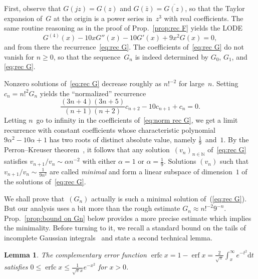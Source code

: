 \documentclass[10pt, conference]{IEEEtran}
\newtheorem{lemma}{Lemma}
\newcommand{\mathd}{\mathrm{d}}
\begin{document}
\begin{IEEEproof}
  First, observe that $G(jz) = G(z)$ and $G(
  \bar{z}) = \overline{G(z)}$, so that the Taylor
  expansion of~$G$ at the origin is a power series in~$z^3$ with
  real coefficients. The same routine reasoning as in the proof of
  Prop.~\ref{prop:rec F} yields the LODE
  \[ G^{(4)}(x) - 10 xG''(x) - 10 G' (x) + 9 x^2 G(x) = 0, \]
  and from there the recurrence~\eqref{eq:rec G}. The coefficients
  of~\eqref{eq:rec G} do not vanish for $n \geq 0$, so that the
  sequence~$G_n$ is indeed determined by $G_0$, $G_1$, and \eqref{eq:rec G}.
\end{IEEEproof}

Nonzero solutions of~\eqref{eq:rec G} decrease roughly as $n!^{- 2}$ for
large~$n$.
Setting~$c_n = n!^2 G_n$ yields the
``normalized'' recurrence
\begin{equation}
  \frac{(3 n + 4) (3 n + 5)}{(n + 1) 
 (n + 2)} c_{n + 2} - 10 c_{n + 1} + c_n = 0. \label{eq:norm rec
  G}
\end{equation}
Letting $n$~go to infinity in the coefficients of~\eqref{eq:norm rec G}, we
get a limit recurrence with constant coefficients whose
characteristic polynomial $9 \alpha^2 - 10 \alpha + 1$ has two roots of
distinct absolute value, namely $\frac{1}{9}$~and~$1$. By the Perron--Kreuser
theorem~{\cite[Theorem~B.10]{Wimp1984}}, it follows that any solution~$(
v_n)_{n \in \mathbb{N}}$ of~\eqref{eq:rec G} satisfies
$v_{n+1}/v_n \sim \alpha n^{-2}$
with either $\alpha = 1$ or $\alpha = \frac{1}{9}$. Solutions $(v_n
)$ such that $v_{n + 1} / v_n \sim \frac{1}{9n^2}$ are called
{\emph{minimal}} and form a linear subspace of dimension~$1$ of the solutions of~\eqref{eq:rec G}.

We shall prove that~$(G_n)$ actually is such a minimal solution of~(\ref{eq:rec
G}). But our analysis uses a bit more than the rough estimate $G_n \approx n!^{- 2} 9^{-n}$. Prop.~\ref{prop:bound on Gn} below
provides a more precise estimate which implies the minimality.
Before turning to it, we recall a standard bound on the tails of incomplete Gaussian integrals~{\cite[Eq.~7.12.1]{DLMF}} and state a second technical lemma.

\begin{lemma}
  \label{lem:erf}The complementary error function
  $\operatorname{erfc} x = 1 - \operatorname{erf} x = \frac{2}{\sqrt{\pi}} 
     \int_x^{\infty} e^{- t^2} \mathd t $
  satisfies
  $ 0 \leq \operatorname{erfc} x \leq \frac{1}{\sqrt{\pi} x} e^{- x^2} $
  for $x > 0$.
\end{lemma}
\end{document}
